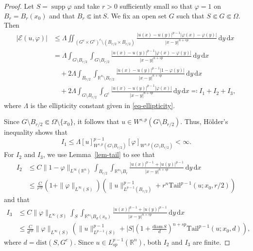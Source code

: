 \documentclass[11pt]{amsart}
\theoremstyle{plain}
\theoremstyle{definition}
\numberwithin{equation}{section}
\DeclareMathOperator{\supp}{supp}
\begin{document}
\begin{proof}
Let $S=\supp\varphi$ and take $r>0$ sufficiently small so that $\varphi=1$ on $B_r=B_r(x_0)$ and that $B_r \Subset \mathrm{int}\,S$. We fix an open set $G$ such that $S \Subset G \Subset \Omega$. Then
\begin{align*}
|\mathcal{E}(u, \varphi)|
&\leq \Lambda \iint_{(G^c \times G^c)^c \setminus (B_{r/2} \times B_{r/2})} \frac{|u(x)-u(y)|^{p-1}|\varphi(x)-\varphi(y)|}{|x-y|^{n+sp}} \,\mathrm{d}y \,\mathrm{d}x \\
&= \Lambda \int_{G \setminus B_{r/2}} \int_{G \setminus B_{r/2}} \frac{|u(x)-u(y)|^{p-1}|\varphi(x)-\varphi(y)|}{|x-y|^{n+sp}} \,\mathrm{d}y \,\mathrm{d}x \\
&\quad + 2\Lambda \int_{B_{r/2}} \int_{\mathbb{R}^n \setminus B_{r/2}} \frac{|u(x)-u(y)|^{p-1}|1-\varphi(y)|}{|x-y|^{n+sp}} \,\mathrm{d}y \,\mathrm{d}x \\
&\quad + 2\Lambda \int_{G \setminus B_{r/2}} \int_{G^c} \frac{|u(x)-u(y)|^{p-1}|\varphi(x)|}{|x-y|^{n+sp}} \,\mathrm{d}y \,\mathrm{d}x \eqqcolon I_1 + I_2 + I_3,
\end{align*}
where $\Lambda$ is the ellipticity constant given in \eqref{eq-ellipticity}.

Since $G \setminus B_{r/2} \Subset \Omega \setminus \{x_0\}$, it follows that $u \in W^{s, p}(G\setminus B_{r/2})$. Thus, H\"older's inequality shows that
\begin{equation*}
I_1 \leq \Lambda [u]_{W^{s, p}(G \setminus B_{r/2})}^{p-1} [\varphi]_{W^{s, p}(G \setminus B_{r/2})} < \infty.
\end{equation*}
For $I_2$ and $I_3$, we use Lemma~\ref{lem-tail} to see that
\begin{align*}
I_2
&\leq C \|1-\varphi\|_{L^\infty(\mathbb{R}^n)} \int_{B_{r/2}} \int_{\mathbb{R}^n \setminus B_r} \frac{|u(x)|^{p-1} + |u(y)|^{p-1}}{|x-y|^{n+sp}} \,\mathrm{d}y \,\mathrm{d}x \\
&\leq \frac{C}{r^{sp}} \left( 1+\|\varphi\|_{L^\infty(S)} \right) \left( \|u\|_{L^{p-1}(B_{r/2})}^{p-1} + r^n \mathrm{Tail}^{p-1}(u; x_0, r/2) \right)
\end{align*}
and that
\begin{align*}
I_3
&\leq C \|\varphi\|_{L^\infty(S)} \int_S \int_{\mathbb{R}^n \setminus B_d(x_0)} \frac{|u(x)|^{p-1} + |u(y)|^{p-1}}{|x-y|^{n+sp}} \,\mathrm{d}y \,\mathrm{d}x \\
&\leq \frac{C}{d^{sp}} \|\varphi\|_{L^\infty(S)} \left( \|u\|_{L^{p-1}(S)}^{p-1} + |S| \left( 1+\frac{\mathrm{diam}\,S}{d} \right)^{n+sp} \mathrm{Tail}^{p-1}(u; x_0, d) \right),
\end{align*}
where $d=\mathrm{dist}(S, G^c)$. Since $u \in L^{p-1}_{sp}(\mathbb{R}^n)$, both $I_2$ and $I_3$ are finite.
\end{proof}
\end{document}
